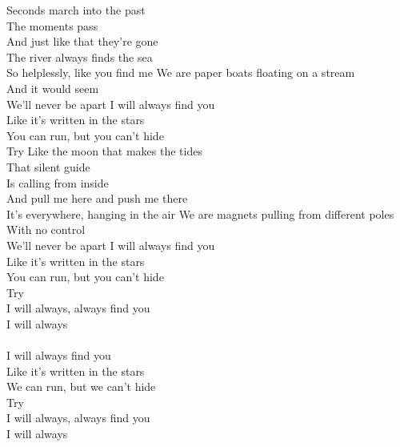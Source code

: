\begin{flushleft}
Seconds march into the past \tab{}\\
The moments pass \tab{}\\
And just like that they're gone \\
The river always finds the sea \tab{}\\
So helplessly, like you find me \tab{}
\hops
We are paper boats floating on a stream \\
And it would seem \tab{}\\
We'll never be apart \tab{}
\hops
I will always find you\tab{}\\
Like it's written in the stars \tab{}\\
You can run, but you can't hide\\
Try \tab{}\tab{}
\hops
Like the moon that makes the tides\\
That silent guide\\
Is calling from inside\\
And pull me here and push me there\\
It's everywhere, hanging in the air
\hops
We are magnets pulling from different poles\\
With no control\\
We'll never be apart
\hops
I will always find you\\
Like it's written in the stars\\
You can run, but you can't hide\\
Try
\hops
{}\\
I will always, always find you \tab{}\\
I will always \tab{}\tab{}\\
\hops
{}\\
I will always find you\\
Like it's written in the stars\\
We can run, but we can't hide\\
Try\\
\hops
I will always, always find you\\
I will always
\end{flushleft}
\newpage